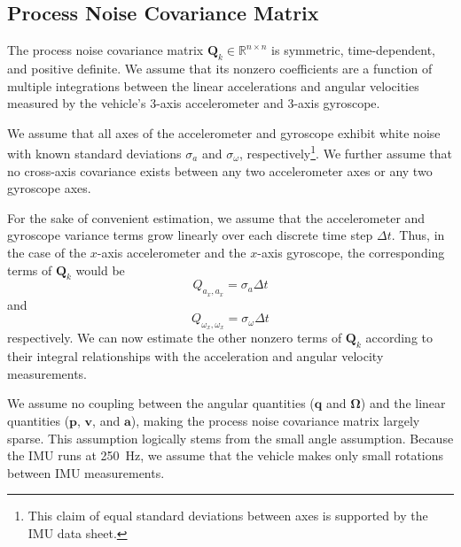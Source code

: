 \subsection{Process Noise Covariance Matrix} \label{sec:Q_Matrix}
The process noise covariance matrix $\mathbf{Q}_{k} \in \mathbb{R}^{n \times n}$ is symmetric, time-dependent, and positive definite. We assume that its nonzero coefficients are a function of multiple integrations between the linear accelerations and angular velocities measured by the vehicle's 3-axis accelerometer and 3-axis gyroscope.

We assume that all axes of the accelerometer and gyroscope exhibit white noise with known standard deviations $\sigma_{a}$ and $\sigma_{\omega}$, respectively\footnote{This claim of equal standard deviations between axes is supported by the IMU data sheet.}. We further assume that no cross-axis covariance exists between any two accelerometer axes or any two gyroscope axes.

For the sake of convenient estimation, we assume that the accelerometer and gyroscope variance terms grow linearly over each discrete time step $\Delta t$. Thus, in the case of the $x$-axis accelerometer and the $x$-axis gyroscope, the corresponding terms of $\mathbf{Q}_{k}$ would be
%
\begin{equation}
Q_{a_{x},a_{x}} = \sigma_{a} \Delta t
\end{equation}
%
and
%
\begin{equation}
Q_{\omega_{x},\omega_{x}} = \sigma_{\omega} \Delta t
\end{equation}
%
respectively. We can now estimate the other nonzero terms of $\mathbf{Q}_{k}$ according to their integral relationships with the acceleration and angular velocity measurements.


We assume no coupling between the angular quantities ($\mathbf{q}$ and $\bm{\Omega}$) and the linear quantities ($\mathbf{p}$, $\mathbf{v}$, and $\mathbf{a}$), making the process noise covariance matrix largely sparse. This assumption logically stems from the small angle assumption. Because the IMU runs at 250~Hz, we assume that the vehicle makes only small rotations between IMU measurements. 



